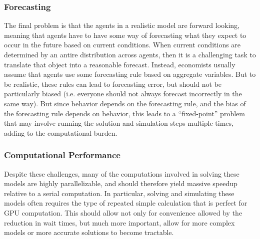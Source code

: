 \documentclass[a4paper,12pt]{article}
\numberwithin{equation}{section}
\theoremstyle{definition}
\begin{document}
\subsubsection{Forecasting}

The final problem is that the agents in a
realistic model are forward looking, meaning that agents have to have
some way of forecasting what they expect to occur in the future based
on current conditions. When current conditions are determined by an
antire distribution across agents, then it is a challenging task to
translate that object into a reasonable forecast. Instead, economists
usually assume that agents use some forecasting rule based on
aggregate variables. But to be realistic, these rules can lead to
forecasting error, but should not be particularly biased
(i.e. everyone should not always forecast incorrectly in the same
way). But since behavior depends on the forecasting rule, and the bias
of the forecasting rule depends on behavior, this leads to a
``fixed-point'' problem that may involve running the solution and
simulation steps multiple times, adding to the computational burden.

\subsubsection{Computational Performance}

Despite these challenges, many of the computations involved in solving these
models are highly parallelizable, and should therefore yield massive
speedup relative to a serial computation. In particular, solving and
simulating these models often requires the type of repeated simple
calculation that is perfect for GPU computation. This should allow not
only for convenience allowed by the reduction in wait times, but much
more important, allow for more complex models or more accurate
solutions to become tractable.
\end{document}
